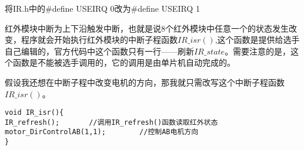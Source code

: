 将IR.h中的\#define USEIRQ 0改为\#define USEIRQ 1

红外模块中断为上下沿触发中断，也就是说8个红外模块中任意一个的状态发生改变，程序就会开始执行红外模块的中断子程函数$IR\_isr()$,这个函数是提供给选手自己编辑的，官方代码中这个函数只有一行——刷新$IR\_state$。需要注意的是，这个函数是不能被选手调用的，它的调用是由单片机自动完成的。

假设我还想在中断子程中改变电机的方向，那我就只需改写这个中断子程函数$IR\_isr()$。

\lstset{language=C}
\begin{lstlisting}
void IR_isr(){
IR_refresh();		//调用IR_refresh()函数读取红外状态
motor_DirControlAB(1,1);		//控制AB电机方向
}

\end{lstlisting}

